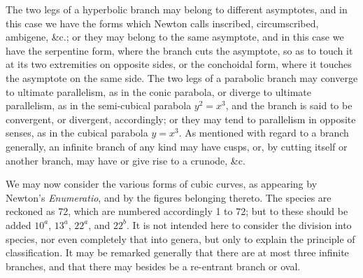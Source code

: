 \documentclass[12pt,a4paper,oneside]{book}
\begin{document}
The two legs of a hyperbolic branch may belong to different asymptotes, and in this case we have the forms which Newton calls inscribed, circumscribed, ambigene, \&c.; or they may belong to the same asymptote, and in this case we have the serpentine form, where the branch cuts the asymptote, so as to touch it at its two extremities on opposite sides, or the conchoidal form, where it touches the asymptote on the same side. The two legs of a parabolic branch may converge to ultimate parallelism, as in the conic parabola, or diverge to ultimate parallelism, as in the semi-cubical parabola $y^{2}=x^{3}$, and the branch is said to be convergent, or divergent, accordingly; or they may tend to parallelism in opposite senses, as in the cubical parabola $y=x^{3}$. As mentioned with regard to a branch generally, an infinite branch of any kind may have cusps, or, by cutting itself or another branch, may have or give rise to a crunode, \&c.

\newpage
We may now consider the various forms of cubic curves, as appearing by Newton's \textit{Enumeratio}, and by the figures belonging thereto. The species are reckoned as 72, which are numbered accordingly 1 to 72; but to these should be added $10^{a}$, $13^{a}$, $22^{a}$, and $22^{b}$. It is not intended here to consider the division into species, nor even completely that into genera, but only to explain the principle of classification. It may be remarked generally that there are at most three infinite branches, and that there may besides be a re-entrant branch or oval.
\end{document}
